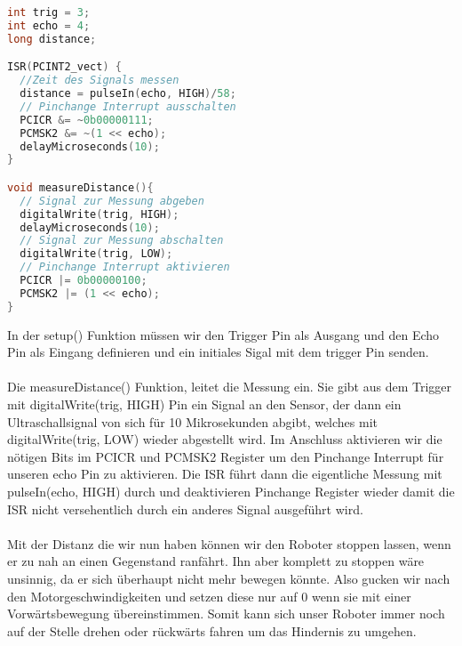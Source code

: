 \documentclass[12pt]{article}
\begin{document}
\begin{file}[HC-SR04]
		
        \begin{lstlisting}[language=C++, inputencoding={utf8}, extendedchars=false]   
int trig = 3;
int echo = 4; 
long distance;        

ISR(PCINT2_vect) {
  //Zeit des Signals messen
  distance = pulseIn(echo, HIGH)/58;
  // Pinchange Interrupt ausschalten
  PCICR &= ~0b00000111;
  PCMSK2 &= ~(1 << echo);   
  delayMicroseconds(10);  
}

void measureDistance(){
  // Signal zur Messung abgeben
  digitalWrite(trig, HIGH);  
  delayMicroseconds(10);
  // Signal zur Messung abschalten
  digitalWrite(trig, LOW); 
  // Pinchange Interrupt aktivieren
  PCICR |= 0b00000100;
  PCMSK2 |= (1 << echo);     
}
        \end{lstlisting}
        
\end{file}
In der setup() Funktion müssen wir den Trigger Pin als Ausgang und den Echo Pin als Eingang definieren und ein initiales Sigal mit dem trigger Pin senden.\\
\\
Die measureDistance() Funktion, leitet die Messung ein. Sie gibt aus dem Trigger mit digitalWrite(trig, HIGH) Pin ein Signal an den Sensor, der dann ein Ultraschallsignal von sich für 10 Mikrosekunden abgibt, welches mit digitalWrite(trig, LOW) wieder abgestellt wird. Im Anschluss aktivieren wir die nötigen Bits im PCICR und PCMSK2 Register um den Pinchange Interrupt für unseren echo Pin zu aktivieren. Die ISR führt dann die eigentliche Messung mit pulseIn(echo, HIGH) durch und deaktivieren Pinchange Register wieder damit die ISR nicht versehentlich durch ein anderes Signal ausgeführt wird.\\
\\
Mit der Distanz die wir nun haben können wir den Roboter stoppen lassen, wenn er zu nah an einen Gegenstand ranfährt. Ihn aber komplett zu stoppen wäre unsinnig, da er sich überhaupt nicht mehr bewegen könnte. Also gucken wir nach den Motorgeschwindigkeiten und setzen diese nur auf 0 wenn sie mit einer Vorwärtsbewegung übereinstimmen. Somit kann sich unser Roboter immer noch auf der Stelle drehen oder rückwärts fahren um das Hindernis zu umgehen. 

\newpage
\end{document}
